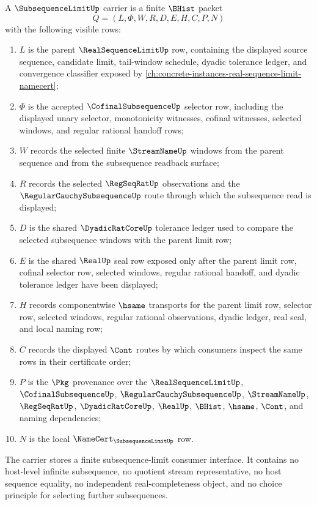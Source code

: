 \begin{definition}\label{def:subsequence-limit-carrier}
A $\SubsequenceLimitUp$ carrier is a finite $\BHist$ packet
$$
Q=(L,\Phi,W,R,D,E,H,C,P,N)
$$
with the following visible rows:
\begin{enumerate}
\item $L$ is the parent $\RealSequenceLimitUp$ row, containing the displayed source sequence, candidate limit, tail-window schedule, dyadic tolerance ledger, and convergence classifier exposed by \autoref{ch:concrete-instances-real-sequence-limit-namecert};
\item $\Phi$ is the accepted $\CofinalSubsequenceUp$ selector row, including the displayed unary selector, monotonicity witnesses, cofinal witnesses, selected windows, and regular rational handoff rows;
\item $W$ records the selected finite $\StreamNameUp$ windows from the parent sequence and from the subsequence readback surface;
\item $R$ records the selected $\RegSeqRatUp$ observations and the $\RegularCauchySubsequenceUp$ route through which the subsequence read is displayed;
\item $D$ is the shared $\DyadicRatCoreUp$ tolerance ledger used to compare the selected subsequence windows with the parent limit row;
\item $E$ is the shared $\RealUp$ seal row exposed only after the parent limit row, cofinal selector row, selected windows, regular rational handoff, and dyadic tolerance ledger have been displayed;
\item $H$ records componentwise $\hsame$ transports for the parent limit row, selector row, selected windows, regular rational observations, dyadic ledger, real seal, and local naming row;
\item $C$ records the displayed $\Cont$ routes by which consumers inspect the same rows in their certificate order;
\item $P$ is the $\Pkg$ provenance over the $\RealSequenceLimitUp$, $\CofinalSubsequenceUp$, $\RegularCauchySubsequenceUp$, $\StreamNameUp$, $\RegSeqRatUp$, $\DyadicRatCoreUp$, $\RealUp$, $\BHist$, $\hsame$, $\Cont$, and naming dependencies;
\item $N$ is the local $\NameCert_{\SubsequenceLimitUp}$ row.
\end{enumerate}
The carrier stores a finite subsequence-limit consumer interface. It contains no host-level infinite subsequence, no quotient stream representative, no host sequence equality, no independent real-completeness object, and no choice principle for selecting further subsequences.
\end{definition}

